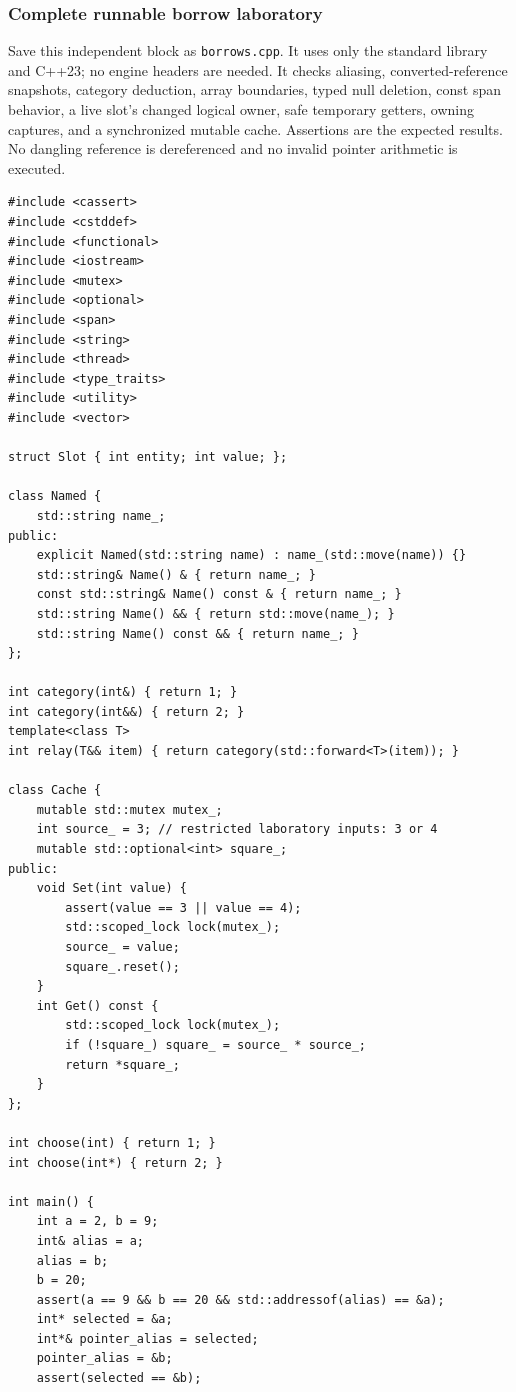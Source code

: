 \subsubsection{Complete runnable borrow laboratory}\label{complete-runnable-borrow-laboratory}

Save this independent block as \texttt{borrows.cpp}. It uses only the standard library and C++23; no engine headers are needed. It checks aliasing, converted-reference snapshots, category deduction, array boundaries, typed null deletion, const span behavior, a live slot's changed logical owner, safe temporary getters, owning captures, and a synchronized mutable cache. Assertions are the expected results. No dangling reference is dereferenced and no invalid pointer arithmetic is executed.

\begin{verbatim}
#include <cassert>
#include <cstddef>
#include <functional>
#include <iostream>
#include <mutex>
#include <optional>
#include <span>
#include <string>
#include <thread>
#include <type_traits>
#include <utility>
#include <vector>

struct Slot { int entity; int value; };

class Named {
    std::string name_;
public:
    explicit Named(std::string name) : name_(std::move(name)) {}
    std::string& Name() & { return name_; }
    const std::string& Name() const & { return name_; }
    std::string Name() && { return std::move(name_); }
    std::string Name() const && { return name_; }
};

int category(int&) { return 1; }
int category(int&&) { return 2; }
template<class T>
int relay(T&& item) { return category(std::forward<T>(item)); }

class Cache {
    mutable std::mutex mutex_;
    int source_ = 3; // restricted laboratory inputs: 3 or 4
    mutable std::optional<int> square_;
public:
    void Set(int value) {
        assert(value == 3 || value == 4);
        std::scoped_lock lock(mutex_);
        source_ = value;
        square_.reset();
    }
    int Get() const {
        std::scoped_lock lock(mutex_);
        if (!square_) square_ = source_ * source_;
        return *square_;
    }
};

int choose(int) { return 1; }
int choose(int*) { return 2; }

int main() {
    int a = 2, b = 9;
    int& alias = a;
    alias = b;
    b = 20;
    assert(a == 9 && b == 20 && std::addressof(alias) == &a);
    int* selected = &a;
    int*& pointer_alias = selected;
    pointer_alias = &b;
    assert(selected == &b);


\end{verbatim}
